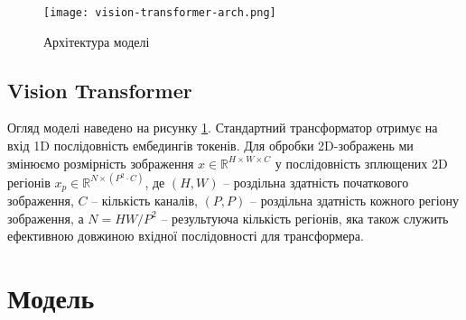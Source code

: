 \begin{figure}[H]
    \centering
    \texttt{[image: vision-transformer-arch.png]}
    \caption{Архітектура моделі}
    \label{fig:model-arch}
\end{figure}

\subsection{Vision Transformer}
Огляд моделі наведено на рисунку \ref{fig:model-arch}.
Стандартний трансформатор отримує на вхід 1D
послідовність ембедингів токенів.
Для обробки 2D-зображень ми змінюємо розмірність зображення
$x \in \mathbb{R}^{H\times W \times C}$ у послідовність
зплющених 2D регіонів $x_p \in \mathbb{R}^{N\times (P^2\cdot C)}$,
де $(H, W)$ -- роздільна здатність початкового
зображення, $C$ -- кількість каналів, $(P, P)$ -- роздільна
здатність кожного регіону зображення,
а $N = HW / P^2$ -- результуюча кількість регіонів,
яка також служить ефективною довжиною вхідної послідовності для
трансформера.

\section{Модель}
